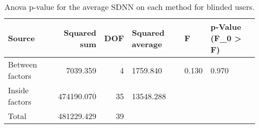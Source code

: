 
\begin{table}[!htb]
\centering
\caption{Anova p-value for the average SDNN on each method for blinded users.}
\label{tab:anova_average_SDNN}
\begin{tabular}{lrrlll}
\toprule
         Source &  Squared sum &  DOF & Squared average &     F & p-Value (F\_0 > F) \\
\midrule
Between factors &     7039.359 &    4 &        1759.840 & 0.130 &             0.970 \\
 Inside factors &   474190.070 &   35 &       13548.288 &       &                   \\
          Total &   481229.429 &   39 &                 &       &                   \\
\bottomrule
\end{tabular}
\end{table}

